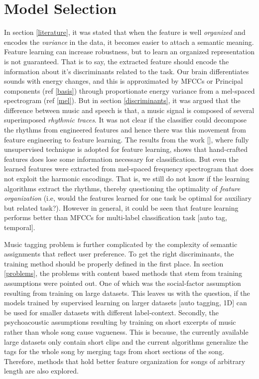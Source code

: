 \section{Model Selection}
\label{model}
In section \ref{literature}, it was stated that when the feature is well \textit{organized} and encodes the \textit{variance} in the data, it becomes easier to attach a semantic meaning. Feature learning can increase robustness, but to learn an organized representation is not guaranteed. That is to say, the extracted feature should encode the information about it's discriminants  related to the task. Our brain differentiates sounds with energy changes, and this is approximated by MFCCs or Principal components (ref \ref{basis}) through proportionate energy variance from a mel-spaced spectrogram (ref \ref{mel}). But in section \ref{discriminants}, it was argued that the difference between music and speech is that, a music signal is composed of several superimposed \textit{rhythmic traces}. It was not clear if the classifier could decompose the rhythms from engineered features and hence there was this movement from feature engineering to feature learning. The results from the work [], where fully unsupervised technique is adopted for feature learning, shows that hand-crafted features does lose some information necessary for classification. But even the learned features were extracted from mel-spaced frequency spectrogram that does not exploit the harmonic encodings. That is, we still do not know if the learning algorithms extract the rhythms, thereby questioning the optimality of \textit{feature organization} (i.e, would the features learned for one task be optimal for auxiliary but related task?). However in general, it could be seen that feature learning performs better than MFCCs for multi-label classification task [auto tag, temporal].   
\bigskip

\noindent Music tagging problem is further complicated by the complexity of semantic assignments that reflect user preference. To get the right discriminants, the training method should be properly defined in the first place. In section \ref{problems}, the problems with content based methods that stem from training assumptions were pointed out. One of which was the social-factor assumption resulting from training on large datasets. This leaves us with the question, if the models trained by supervised learning on larger datasets [auto tagging, 1D] can be used for smaller datasets with different label-context. Secondly, the psychoacoustic assumptions resulting by training on short excerpts of music rather than whole song cause  vagueness. This is because, the currently available large datasets only contain short clips and the current algorithms generalize the tags for the whole song by merging tags from short sections of the song. Therefore, methods that hold better feature organization for songs of arbitrary length are also explored.   

